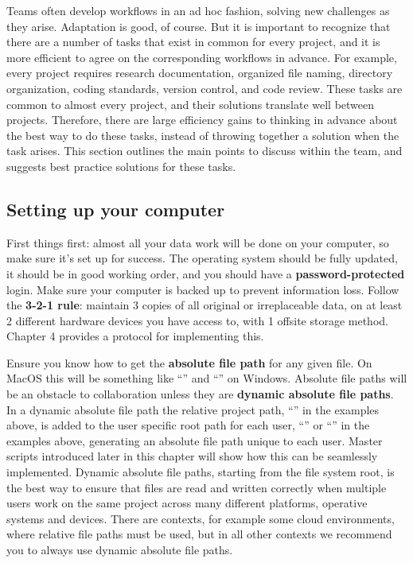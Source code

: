 Teams often develop workflows in an ad hoc fashion,
solving new challenges as they arise.
Adaptation is good, of course.
But it is important to recognize
that there are a number of tasks that exist in common for every project,
and it is more efficient to agree on the corresponding workflows in advance.
For example, every project requires
research documentation, organized file naming, directory organization,
coding standards, version control, and code review.
These tasks are common to almost every project,
and their solutions translate well between projects.
Therefore, there are large efficiency gains to
thinking in advance about the best way to do these tasks,
instead of throwing together a solution when the task arises.
This section outlines the main points to discuss within the team,
and suggests best practice solutions for these tasks.

\subsection{Setting up your computer}

First things first:
almost all your data work will be done on your computer,
so make sure it's set up for success.
The operating system should be fully updated,
it should be in good working order,
and you should have a \textbf{password-protected} login.
Make sure your computer is backed up to prevent information loss.
Follow the \textbf{3-2-1 rule}: maintain 3 copies of all original or irreplaceable data,
on at least 2 different hardware devices you have access to,
with 1 offsite storage method.
Chapter 4 provides a protocol for implementing this.

Ensure you know how to get the \textbf{absolute file path} for any given file.
On MacOS this will be something like ``''
and ``'' on Windows.
Absolute file paths will be an obstacle to collaboration
unless they are \textbf{dynamic absolute file paths}.
In a dynamic absolute file path the relative project path,
``'' in the examples above, is added
to the user specific root path for each user,
``'' or ``'' in the examples above,
generating an absolute file path unique to each user.
Master scripts introduced later in this chapter will show
how this can be seamlessly implemented.
Dynamic absolute file paths, starting from the file system root,
is the best way to ensure that files are read and written correctly
when multiple users work on the same project
across many different platforms, operative systems and devices.
There are contexts, for example some cloud environments,
where relative file paths must be used,
but in all other contexts we recommend you
to always use dynamic absolute file paths.

